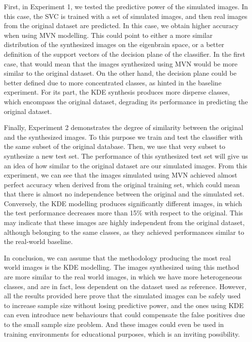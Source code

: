 First, in Experiment 1, we tested the predictive power of the simulated images. In this case, the SVC is trained with a set of simulated images, and then real images from the original dataset are predicted. In this case, we obtain higher accuracy when using \ac{MVN} modelling. This could point to either a more similar distribution of the synthesized images on the eigenbrain space, or a better definition of the support vectors of the decision plane of the classifier. In the first case, that would mean that the images synthesized using \ac{MVN} would be more similar to the original dataset. On the other hand, the decision plane could be better defined due to more concentrated classes, as hinted in the baseline experiment. For its part, the \ac{KDE} synthesis produces more disperse classes, which encompass the original dataset, degrading its performance in predicting the original dataset. 

Finally, Experiment 2 demonstrates the degree of similarity between the original and the synthesized images. To this purpose we train and test the classifier with the same subset of the original database. Then, we use that very subset to synthesize a new test set. The performance of this synthesized test set will give us an idea of how similar to the original dataset are our simulated images. From this experiment, we can see that the images simulated using \ac{MVN} achieved almost perfect accuracy when derived from the original training set, which could mean that there is almost no independence between the original and the simulated set. Conversely, the \ac{KDE} modelling produces significantly different images, in which the test performance decreases more than 15\% with respect to the original. This may indicate that these images are highly independent from the original dataset, although belonging to the same classes, as they achieved performances similar to the real-world baseline. 

In conclusion, we can assume that the methodology producing the most real world images is the \ac{KDE} modelling. The images synthesized using this method are more similar to the real world images, in which we have more heterogeneous classes, and are in fact, less dependent on the dataset used as reference. However, all the results provided here prove that the simulated images can be safely used to increase sample size without losing predictive power, and the ones using \ac{KDE} can even introduce new behaviours that could compensate the false positives due to the small sample size problem. And these images could even be used in training environments for educational purposes, which is an inviting possibility. 